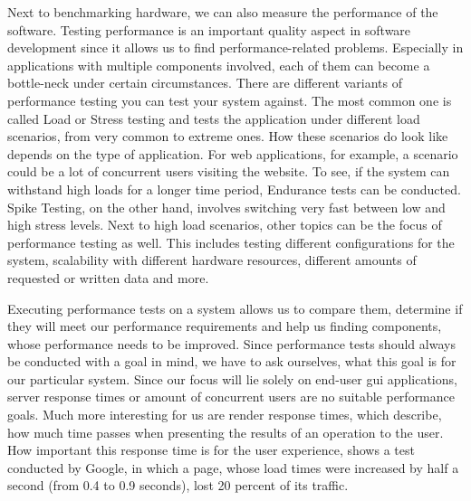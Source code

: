 Next to benchmarking hardware, we can also measure the performance of the software.
Testing performance is an important quality aspect in software development
since it allows us to find performance-related problems. Especially in
applications with multiple components involved, each of them can become a
bottle-neck under certain circumstances. There are different variants of performance
testing you can test your system against. The most common one is called Load or
Stress testing and tests the application under different load scenarios, from
very common to extreme ones. How these scenarios do look like depends on the
type of application. For web applications, for example, a scenario could be
a lot of concurrent users visiting the website. To see, if the system can
withstand high loads for a longer time period, Endurance tests can be conducted.
Spike Testing, on the other hand, involves switching very fast between low and
high stress levels. Next to high load scenarios, other topics can be the focus
of performance testing as well. This includes testing different configurations
for the system, scalability with different hardware resources, different amounts
of requested or written data and more.

Executing performance tests on a system allows us to compare them, determine if
they will meet our performance requirements and help us finding components,
whose performance needs to be improved. Since performance tests should always be
conducted with a goal in mind, we have to ask ourselves, what this goal is for
our particular system. Since our focus will lie solely on end-user \gls{gui}
applications, server response times or amount of concurrent users are no
suitable performance goals. Much more interesting for us are render response
times, which describe, how much time passes when presenting the results of an
operation to the user. How important this response time is for the user
experience, shows a test conducted by Google, in which a page, whose load times
were increased by half a second (from 0.4 to 0.9 seconds), lost 20 percent of
its traffic.
\cite{SoftwarePerformanceTesting, RenderResponseTimes, PerformanceIsAFeature}

